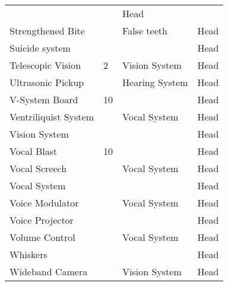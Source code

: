\documentclass[twoside]{book}
\begin{document}
\begin{longtable}{p{1.25in}p{2em}ll}
  &
  
  &
   Head 
  \tabularnewline
      
  \raggedright
           Strengthened Bite 
  &
  
  &
   False teeth 
  &
   Head 
  \tabularnewline
      
  \raggedright
           Suicide system 
  &
  
  &
  
  &
   Head 
  \tabularnewline
      
  \raggedright
           Telescopic Vision 
  &
   2 
  &
   Vision System 
  &
   Head 
  \tabularnewline
      
  \raggedright
           Ultrasonic Pickup 
  &
  
  &
   Hearing System 
  &
   Head 
  \tabularnewline
      
  \raggedright
           V-System Board 
  &
   10 
  &
  
  &
   Head 
  \tabularnewline
      
  \raggedright
           Ventriliquist System 
  &
  
  &
   Vocal System 
  &
   Head 
  \tabularnewline
      
  \raggedright
           Vision System 
  &
  
  &
  
  &
   Head 
  \tabularnewline
      
  \raggedright
           Vocal Blast 
  &
   10 
  &
  
  &
   Head 
  \tabularnewline
      
  \raggedright
           Vocal Screech 
  &
  
  &
   Vocal System 
  &
   Head 
  \tabularnewline
      
  \raggedright
           Vocal System 
  &
  
  &
  
  &
   Head 
  \tabularnewline
      
  \raggedright
           Voice Modulator 
  &
  
  &
   Vocal System 
  &
   Head 
  \tabularnewline
      
  \raggedright
           Voice Projector 
  &
  
  &
  
  &
   Head 
  \tabularnewline
      
  \raggedright
           Volume Control 
  &
  
  &
   Vocal System 
  &
   Head 
  \tabularnewline
      
  \raggedright
           Whiskers 
  &
  
  &
  
  &
   Head 
  \tabularnewline
      
  \raggedright
           Wideband Camera 
  &
  
  &
   Vision System 
  &
   Head 
  \tabularnewline
      
\end{longtable}
    
\end{document}
